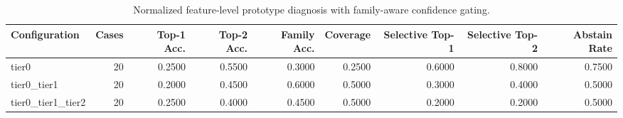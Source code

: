 \begin{table}[t]
\centering
\caption{Normalized feature-level prototype diagnosis with family-aware confidence gating.}
\label{tab:dice_stressor_hierarchical_diagnosis}
\footnotesize
\begin{tabular}{lrrrrrrrr}
\toprule
Configuration & Cases & Top-1 Acc. & Top-2 Acc. & Family Acc. & Coverage & Selective Top-1 & Selective Top-2 & Abstain Rate \\
\midrule
tier0 & 20 & 0.2500 & 0.5500 & 0.3000 & 0.2500 & 0.6000 & 0.8000 & 0.7500 \\
tier0_tier1 & 20 & 0.2000 & 0.4500 & 0.6000 & 0.5000 & 0.3000 & 0.4000 & 0.5000 \\
tier0_tier1_tier2 & 20 & 0.2500 & 0.4000 & 0.4500 & 0.5000 & 0.2000 & 0.2000 & 0.5000 \\
\bottomrule
\end{tabular}

\end{table}
